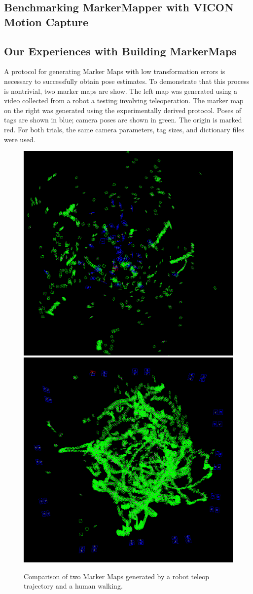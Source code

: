 \documentclass{article}
\begin{document}
	\subsection{Benchmarking MarkerMapper with VICON Motion Capture}

	\subsection{Our Experiences with Building MarkerMaps}
    A protocol for generating Marker Maps with low transformation errors is necessary to successfully obtain pose estimates. To demonstrate that this process is nontrivial, two marker maps are show. The left map was generated using a video collected from a robot a testing involving teleoperation. The marker map on the right was generated using the experimentally derived protocol. Poses of tags are shown in blue; camera poses are shown in green. The origin is marked red. For both trials, the same camera parameters, tag sizes, and dictionary files were used.

    \begin{figure}[H]
      \centering
      \includegraphics[width=0.49\linewidth]{./images/marker_mapper_example_bad.png}
      \includegraphics[width=0.49\linewidth]{./images/marker_mapper_good_ps3_3_17.png}
      \caption{Comparison of two Marker Maps generated by a robot teleop trajectory and a human walking.}
      \label{fig:marker_mapper_comparison}
    \end{figure} 
\end{document}
